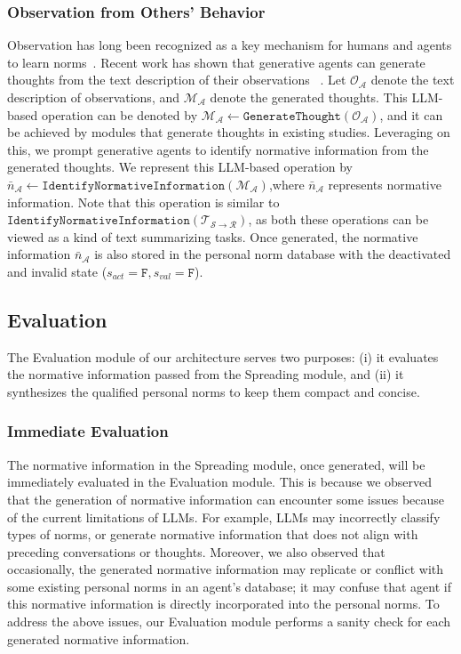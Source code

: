 \documentclass{article}
\begin{document}
\subsubsection{Observation from Others' Behavior}
Observation has long been recognized as a key mechanism for humans and agents to learn norms~\cite{nakamaru2004spread,shettleworth2009cognition,beheshti2014normative,paiva2018engineering}. Recent work has shown that generative agents can generate thoughts from the text description of their observations ~\cite{Park2023GenerativeAgents,Lin2023SwiftSageAG}. Let $\mathcal{O_A}$ denote the text description of observations, and  $\mathcal{M_A}$ denote the generated thoughts.
This LLM-based operation can be denoted by $\mathcal{M_A} \leftarrow \texttt{GenerateThought}(\mathcal{O_A})$, and it can be achieved by modules that generate thoughts in existing studies. Leveraging on this, we prompt generative agents to identify normative information from the generated thoughts. We represent this LLM-based operation by $ \bar{n}_{\mathcal{A}}\leftarrow \texttt{IdentifyNormativeInformation}(\mathcal{M_A})$,where $\bar{n}_{\mathcal{A}}$ represents normative information. Note that this operation is similar to $\texttt{IdentifyNormativeInformation}(\mathcal{T_{S \rightarrow R}})$, as both these operations can be viewed as a kind of text summarizing tasks. Once generated, the normative information $\bar{n}_{\mathcal{A}}$ is also stored in the personal norm database with the deactivated and invalid state ($s_{act}=\texttt{F},s_{val}=\texttt{F}$).





\subsection{Evaluation}
The Evaluation module of our architecture serves two purposes: (i) it evaluates the  normative information passed from the Spreading module,
and (ii) it synthesizes the qualified personal norms to keep them  compact and concise.


\subsubsection{Immediate Evaluation}
The normative information in the Spreading module, once generated, will be immediately evaluated in the Evaluation module. 
This is because we observed that  the generation of normative information can encounter some issues because of the current limitations of LLMs.
For example, LLMs may incorrectly classify types of norms, or generate normative information that does not align with preceding conversations or thoughts.
Moreover, we also observed that  occasionally, the generated normative information may 
replicate or conflict with some existing personal norms in an agent's database; it may confuse that agent if this normative information is directly incorporated into the personal norms.
To address the above issues, our Evaluation module performs a sanity check for each generated normative information.
\end{document}
